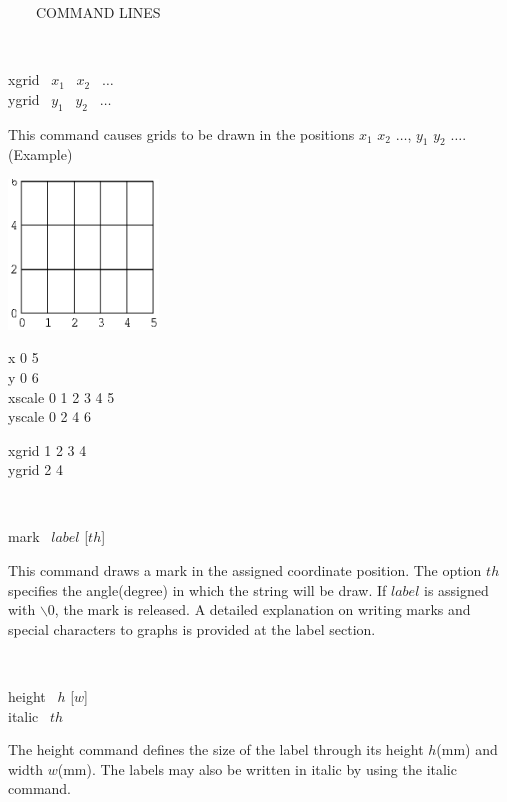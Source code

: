 \begin{qsection}{\ ~~~COMMAND LINES}
\begin{minipage}[t]{9cm}
\end{minipage}\\

\begin{minipage}[t]{5.5cm}
xgrid ~$x_1$ ~$x_2$ ~$\dots$\\
ygrid ~$y_1$ ~$y_2$ ~$\dots$
\end{minipage}
\begin{minipage}[t]{9cm}
This command causes grids to be drawn in the positions $x_1$ $x_2$ $\dots$,
$y_1$ $y_2$ $\dots$.\\
(Example)\\
\begin{minipage}[t]{4.3cm}
 \includegraphics[width=4cm]{fig/grid.eps}
\end{minipage}
\begin{minipage}[b]{4.5cm}
\baselineskip 5pt
x 0 5\\
y 0 6\\
xscale 0 1 2 3 4 5\\
yscale 0 2 4 6

\vspace{3mm}
xgrid 1 2 3 4\\
ygrid 2 4
\vspace*{1cm}
\end{minipage}
\end{minipage}\\


\begin{minipage}[t]{5.5cm}
mark ~$label$ [$th$]
\end{minipage}
\begin{minipage}[t]{9cm}
This command draws a mark in the assigned coordinate position.
The option $th$ specifies the angle(degree) in which the string will be draw.
If $label$ is assigned with $\backslash 0$, the mark is released.
A detailed explanation on writing marks and special characters to graphs is
 provided at the label section.
\end{minipage}\\

\begin{minipage}[t]{5.5cm}
height ~$h$ [$w$]\\
italic ~$th$
\end{minipage}
\begin{minipage}[t]{9cm}
The height command defines the size of the label through its
height $h$(mm) and width $w$(mm).
The labels may also be written in italic by using the italic command.
\end{minipage}\\


\end{qsection}
